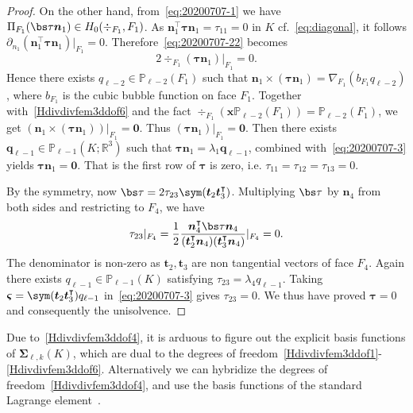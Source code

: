 \begin{proof}
On the other hand, from~\eqref{eq:20200707-1} we have $\Pi_{F_1}(\bs\tau\boldsymbol n_1)\in H_0(\div_{F_1}, F_1) $.
As $\boldsymbol n_1^{\intercal}\boldsymbol \tau \boldsymbol n_1 = \tau_{11} = 0$ in $K$ cf.~\eqref{eq:diagonal}, it follows $\partial_{n_1}(\boldsymbol n_1^{\intercal}\boldsymbol \tau \boldsymbol n_1)|_{F_1}=0$. Therefore~\eqref{eq:20200707-22} becomes
\[
2\div_{F_1}(\boldsymbol\tau \boldsymbol n_1)|_{F_1}=0.
\]
Hence there exists $q_{\ell-2}\in \mathbb P_{\ell-2}(F_1)$ such that $\boldsymbol n_1\times(\boldsymbol\tau \boldsymbol n_1)=\nabla_{F_1}(b_{F_1}q_{\ell-2})$, 
where $b_{F_1}$ is the cubic bubble function on face $F_1$.
Together with~\eqref{Hdivdivfem3ddof6} and the fact $\div_{F_1}(\boldsymbol x\mathbb P_{\ell-2}(F_1))=\mathbb P_{\ell-2}(F_1)$, 
we get $(\boldsymbol n_1\times(\boldsymbol\tau \boldsymbol n_1))|_{F_1}=\boldsymbol 0$.
Thus $(\boldsymbol\tau \boldsymbol n_1)|_{F_1}=\boldsymbol 0$.
Then there exists $\boldsymbol q_{\ell-1}\in \mathbb P_{\ell-1}(K;\mathbb R^3)$ such that $\boldsymbol\tau \boldsymbol n_1=\lambda_1\boldsymbol q_{\ell-1}$,  combined with~\eqref{eq:20200707-3} yields $\boldsymbol\tau \boldsymbol n_1=\boldsymbol 0$. That is the first row of $\boldsymbol \tau$ is zero, i.e. $\tau_{11}=\tau_{12}=\tau_{13}=0$. 

By the symmetry, now
$
\bs\tau=2\tau_{23}\sym(\boldsymbol t_2\boldsymbol t_3^{\intercal})
$. Multiplying $\bs\tau$ by $\boldsymbol n_4$ from both sides and restricting to $F_4$, we have
\[
\tau_{23}|_{F_4}=\frac{1}{2}\frac{\boldsymbol n_4^{\intercal}\bs\tau\boldsymbol n_4}{(\boldsymbol t_2^{\intercal}\boldsymbol n_4)(\boldsymbol t_3^{\intercal}\boldsymbol n_4)}|_{F_4}=0.
\]
The denominator is non-zero as $\boldsymbol t_2, \boldsymbol t_3$ are non tangential vectors of face $F_4$. 
Again there exists $q_{\ell-1}\in \mathbb P_{\ell-1}(K)$ satisfying $\tau_{23}=\lambda_4q_{\ell-1}$.
Taking $\boldsymbol \varsigma=\sym(\boldsymbol t_2\boldsymbol t_3^{\intercal})q_{\ell-1}$ in~\eqref{eq:20200707-3} gives $\tau_{23}=0$. We thus have proved $\boldsymbol \tau = 0$ and consequently the unisolvence. 
\end{proof}

Due to~\eqref{Hdivdivfem3ddof4}, it is arduous to figure out the explicit basis functions of  $\boldsymbol \Sigma_{\ell,k}(K)$, which are dual to the degrees of freedom~\eqref{Hdivdivfem3ddof1}-\eqref{Hdivdivfem3ddof6}.
Alternatively we can hybridize the degrees of freedom~\eqref{Hdivdivfem3ddof4}, and use the basis functions of the standard Lagrange element~\cite{ChenHuang2020}. 

